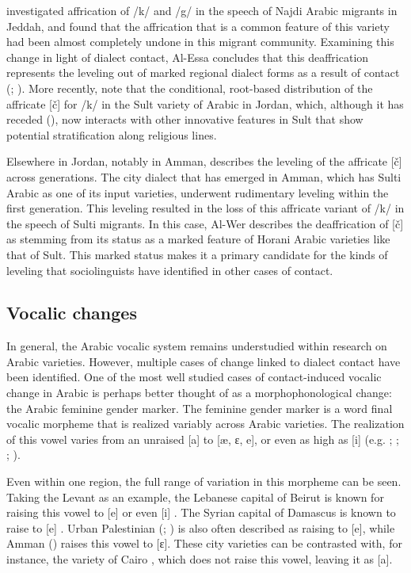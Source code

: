 \documentclass[output=paper]{langsci/langscibook}
\begin{document}
  \citet{Al-Essa2008} investigated affrication of /k/ and /g/ in the speech of Najdi Arabic migrants in Jeddah, and found that the affrication that is a common feature of this variety had been almost completely undone in this migrant community. Examining this change in light of dialect contact, Al-Essa concludes that this deaffrication represents the leveling out of marked regional dialect forms as a result of contact (\citealt{Trudgill1986}; \citealt{KerswillWilliams2000}). More recently, \citet{Al-WerEtAl2015} note that the conditional, root-based distribution of the affricate [č] for /k/ in the Sult variety of Arabic in Jordan, which, although it has receded (\citealt{Al-Wer1991}), now interacts with other innovative features in Sult that show potential stratification along religious lines. 

  Elsewhere in Jordan, notably in Amman, \citet{Al-Wer2007} describes the leveling of the affricate [č] across generations. The city dialect that has emerged in Amman, which has Sulti Arabic as one of its input varieties, underwent rudimentary leveling \citep{Trudgill2004} within the first generation. This leveling resulted in the loss of this affricate variant of /k/ in the speech of Sulti migrants. In this case, Al-Wer describes the deaffrication of [č] as stemming from its status as a marked feature of Horani Arabic varieties like that of Sult. This marked status makes it a primary candidate for the kinds of leveling that sociolinguists have identified in other cases of contact. 


 
 \subsection{Vocalic changes}


In general, the Arabic vocalic system remains understudied within research on Arabic varieties. However, multiple cases of change linked to dialect contact have been identified. One of the most well studied cases of contact-induced vocalic change in Arabic is perhaps better thought of as a morphophonological change: the Arabic feminine gender marker. The feminine gender marker is a word final vocalic morpheme that is realized variably across Arabic varieties. The realization of this vowel varies from an unraised [a] to [æ, ɛ, e], or even as high as [i] (e.g. \citealt{Al-Wer2007}; \citealt{Naïm2011}; \citealt{Shahin2011}; \citealt{Woidich2011}). 

Even within one region, the full range of variation in this morpheme can be seen. Taking the Levant as an example, the Lebanese capital of Beirut is known for raising this vowel to [e] or even [i] \citep{Naïm2011}. The Syrian capital of Damascus is known to raise to [e] \citep{Lentin2011Damascus}. Urban Palestinian (\citealt{Rosenhouse2011}; \citealt{Shahin2011}) is also often described as raising to [e], while Amman (\citealt{Al-Wer2007}) raises this vowel to [ɛ]. These city varieties can be contrasted with, for instance, the variety of Cairo \citep{Woidich2011}, which does not raise this vowel, leaving it as [a]. 
\end{document}
